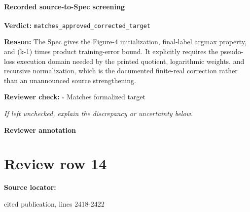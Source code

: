 \documentclass[10pt]{article}
\newcommand{\reviewerbox}{%
  \par\noindent\fbox{\parbox{0.96\linewidth}{\rule{0pt}{0.38in}}}\par
}
\newcommand{\reviewmatch}[1]{%
  \par\noindent\textbf{Reviewer check:} $\square$\; #1\par
  \noindent\emph{If left unchecked, explain the discrepancy or uncertainty below.}\par
}
\begin{document}
\paragraph{Recorded source-to-Spec screening}
\textbf{Verdict:} \texttt{matches\_approved\_corrected\_target}
\\
{\raggedright
\textbf{Reason:} The Spec gives the Figure-\allowbreak{}4 initialization, final-\allowbreak{}label argmax property, and (k-\allowbreak{}1) times product training-\allowbreak{}error bound.\allowbreak{} It explicitly requires the pseudo-\allowbreak{}loss execution domain needed by the printed quotient, logarithmic weights, and recursive normalization, which is the documented finite-\allowbreak{}real correction rather than an unannounced source strengthening.\allowbreak{}
\par}
\reviewmatch{Matches formalized target}
\noindent\textbf{Reviewer annotation}\par
\reviewerbox
\clearpage
\hypertarget{source-claim-cc8c8110439ebc5a}{}
\section*{Review row 14}
\textbf{Source locator:} {\footnotesize\raggedright cited publication, lines 2418-\allowbreak{}2422\par}
\end{document}
